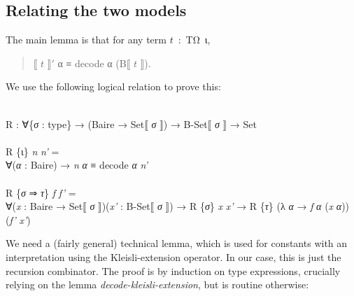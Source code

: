 \documentclass{entcs} \usepackage{prentcsmacro}
\newcommand{\AgdaC}[1]{\mbox{#1}}
\newcommand{\AgdaFontStyle}[1]{\textsf{#1}}
\newcommand{\AgdaBoundFontStyle}[1]{\textit{#1}}
\newcommand{\AgdaSymbol}      [1]{\textcolor{AgdaSymbol}{#1}}
\newcommand{\AgdaPrimitiveType}[1]
    {\AgdaFontStyle{\textcolor{AgdaPrimitiveType}{#1}}}
\newcommand{\AgdaBound}    [1]{\AgdaBoundFontStyle{\textcolor{AgdaBound}{#1}}}
\newcommand{\AgdaInductiveConstructor}[1]
    {\AgdaFontStyle{\textcolor{AgdaInductiveConstructor}{#1}}}
\newcommand{\AgdaDatatype} [1]{\AgdaFontStyle{\textcolor{AgdaDatatype}{#1}}}
\newcommand{\AgdaFunction} [1]{\AgdaFontStyle{\textcolor{AgdaFunction}{#1}}}
\newcommand{\AgdaIndent}[1]{\quad}
\newcommand{\AgdaCodeStyle}{\small}
\newenvironment{code}%
{\noindent\AgdaCodeStyle\pboxed}%
{\endpboxed\par\noindent%
\ignorespacesafterend}
\begin{document}
\subsection{Relating the two models} \label{section:logical:relation}

The main lemma is that for any term \AgdaC{$t$ : TΩ ι}, 
\begin{quote}
  ⟦ $t$ ⟧$'$ α ≡ decode α (B⟦ $t$ ⟧).
\end{quote}
We use the following logical relation to prove this:

\begin{code}\>\<%
\\
\>\AgdaFunction{R} \AgdaSymbol{:} \AgdaSymbol{∀\{}\AgdaBound{σ} \AgdaSymbol{:} \AgdaDatatype{type}\AgdaSymbol{\}} \AgdaSymbol{→} \AgdaSymbol{(}\AgdaFunction{Baire} \AgdaSymbol{→} \AgdaFunction{Set⟦} \AgdaBound{σ} \AgdaFunction{⟧}\AgdaSymbol{)} \AgdaSymbol{→} \AgdaFunction{B-Set⟦} \AgdaBound{σ} \AgdaFunction{⟧} \AgdaSymbol{→} \AgdaPrimitiveType{Set}\<%
\\
%
\\
\>\AgdaFunction{R} \AgdaSymbol{\{}\AgdaInductiveConstructor{ι}\AgdaSymbol{\}} \AgdaBound{n} \AgdaBound{n'} \AgdaSymbol{=} \<[13]%
\>[13]\<%
\\
\>[0]\AgdaIndent{2}{}\<[2]%
\>[2]\AgdaSymbol{∀(}\AgdaBound{α} \AgdaSymbol{:} \AgdaFunction{Baire}\AgdaSymbol{)} \AgdaSymbol{→} \AgdaBound{n} \AgdaBound{α} \AgdaDatatype{≡} \AgdaFunction{decode} \AgdaBound{α} \AgdaBound{n'}\<%
\\
%
\\
\>\AgdaFunction{R} \AgdaSymbol{\{}\AgdaBound{σ} \AgdaInductiveConstructor{⇒} \AgdaBound{τ}\AgdaSymbol{\}} \AgdaBound{f} \AgdaBound{f'} \AgdaSymbol{=} \<[17]%
\>[17]\<%
\\
\>[0]\AgdaIndent{2}{}\<[2]%
\>[2]\AgdaSymbol{∀(}\AgdaBound{x} \AgdaSymbol{:} \AgdaFunction{Baire} \AgdaSymbol{→} \AgdaFunction{Set⟦} \AgdaBound{σ} \AgdaFunction{⟧}\AgdaSymbol{)(}\AgdaBound{x'} \AgdaSymbol{:} \AgdaFunction{B-Set⟦} \AgdaBound{σ} \AgdaFunction{⟧}\AgdaSymbol{)} \AgdaSymbol{→} \AgdaFunction{R} \AgdaSymbol{\{}\AgdaBound{σ}\AgdaSymbol{\}} \AgdaBound{x} \AgdaBound{x'} \AgdaSymbol{→} \AgdaFunction{R} \AgdaSymbol{\{}\AgdaBound{τ}\AgdaSymbol{\}} \AgdaSymbol{(λ} \AgdaBound{α} \AgdaSymbol{→} \AgdaBound{f} \AgdaBound{α} \AgdaSymbol{(}\AgdaBound{x} \AgdaBound{α}\AgdaSymbol{))} \AgdaSymbol{(}\AgdaBound{f'} \AgdaBound{x'}\AgdaSymbol{)}\<%
\\
\>\<\end{code}
We need a (fairly general) technical lemma, which is used for
constants with an interpretation using the Kleisli-extension
operator. In our case, this is just the recursion combinator.  The
proof is by induction on type expressions, crucially relying on the lemma
\emph{decode-kleisli-extension}, but is routine otherwise:
\end{document}
